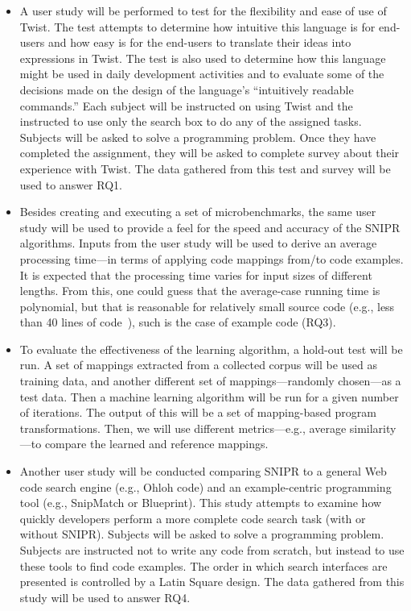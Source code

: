 \documentclass[conference]{IEEEtran}
\begin{document}
\begin{itemize}  
\item A user study will be performed to test for the flexibility and ease of use of Twist. The test attempts to determine how intuitive this language is for end-users and how easy is for the end-users to translate their ideas into expressions in Twist. The test is also used to determine how this language might be used in daily development activities and to evaluate some of the decisions made on the design of the language's ``intuitively readable commands.'' Each subject will be instructed on using Twist and the instructed to use only the search box to do any of the assigned tasks. Subjects will be asked to solve a programming problem. Once they have completed the assignment, they will be asked to complete survey about their experience with Twist. The data gathered from this test and survey will be used to answer RQ1.
\item Besides creating and executing a set of microbenchmarks, the same user study will be used to provide a feel for the speed and accuracy of the  \uppercase{SnipR} algorithms. Inputs from the user study will be used to derive an average processing time---in terms of applying code mappings from/to code examples. It is expected that the processing time varies for input sizes of different lengths. From this, one could guess that the average-case running time is polynomial, but that is reasonable for relatively small source code (e.g., less than 40 lines of code~\cite{Brandt:2009ew}), such is the case of example code (RQ3).
\item To evaluate the effectiveness of the learning algorithm, a hold-out test will be run. A set of mappings extracted from a collected corpus will be used as training data, and another different set of mappings---randomly chosen---as a test data. Then a machine learning algorithm will be run for a given number of iterations. The output of this will be a set of mapping-based program transformations. Then, we will use different metrics---e.g., average similarity---to compare the learned and reference mappings. 
\item Another user study will be conducted comparing \uppercase{SnipR} to a general Web code search engine (e.g., Ohloh code) and an example-centric programming tool (e.g., SnipMatch or Blueprint). This study attempts to examine how quickly developers perform a more complete code search task (with or without \uppercase{SnipR}). Subjects will be asked to solve a programming problem. Subjects are instructed not to write any code from scratch, but instead to use these tools to find code examples. The order in which search interfaces are presented is controlled by a Latin Square design. The data gathered from this study will be used to answer RQ4.       
\end{itemize}
\end{document}
